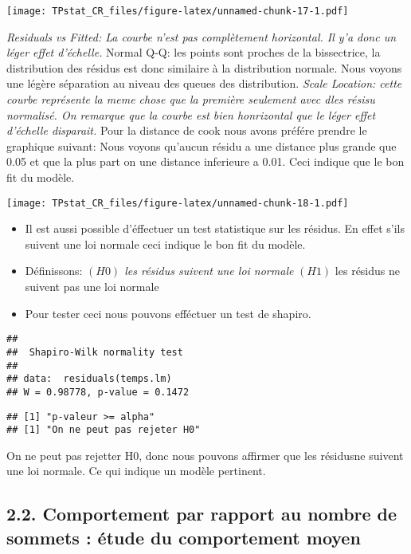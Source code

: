 \documentclass[
]{article}
\providecommand{\tightlist}{%
  \setlength{\itemsep}{0pt}\setlength{\parskip}{0pt}}
\begin{document}
\texttt{[image: TPstat\_CR\_files/figure-latex/unnamed-chunk-17-1.pdf]}

\emph{Residuals vs Fitted: La courbe n'est pas complètement horizontal.
Il y'a donc un léger effet d'échelle. } Normal Q-Q: les points sont
proches de la bissectrice, la distribution des résidus est donc
similaire à la distribution normale. Nous voyons une légère séparation
au niveau des queues des distribution. \emph{Scale Location: cette
courbe représente la meme chose que la première seulement avec dles
résisu normalisé. On remarque que la courbe est bien honrizontal que le
léger effet d'échelle disparait. }Pour la distance de cook nous avons
préfére prendre le graphique suivant: Nous voyons qu'aucun résidu a une
distance plus grande que 0.05 et que la plus part on une distance
inferieure a 0.01. Ceci indique que le bon fit du modèle.

\texttt{[image: TPstat\_CR\_files/figure-latex/unnamed-chunk-18-1.pdf]}

\begin{itemize}
\tightlist
\item
  Il est aussi possible d'éffectuer un test statistique sur les résidus.
  En effet s'ils suivent une loi normale ceci indique le bon fit du
  modèle.
\item
  Définissons: \emph{\((H0)\) les résidus suivent une loi normale
  }\((H1)\) les résidus ne suivent pas une loi normale
\item
  Pour tester ceci nous pouvons efféctuer un test de shapiro.
\end{itemize}

\begin{verbatim}
## 
##  Shapiro-Wilk normality test
## 
## data:  residuals(temps.lm)
## W = 0.98778, p-value = 0.1472
\end{verbatim}

\begin{verbatim}
## [1] "p-valeur >= alpha"
## [1] "On ne peut pas rejeter H0"
\end{verbatim}

On ne peut pas rejetter H0, donc nous pouvons affirmer que les résidusne
suivent une loi normale. Ce qui indique un modèle pertinent.

\hypertarget{comportement-par-rapport-au-nombre-de-sommets-uxe9tude-du-comportement-moyen}{%
\subsection{2.2. Comportement par rapport au nombre de sommets : étude
du comportement
moyen}\label{comportement-par-rapport-au-nombre-de-sommets-uxe9tude-du-comportement-moyen}}
\end{document}
